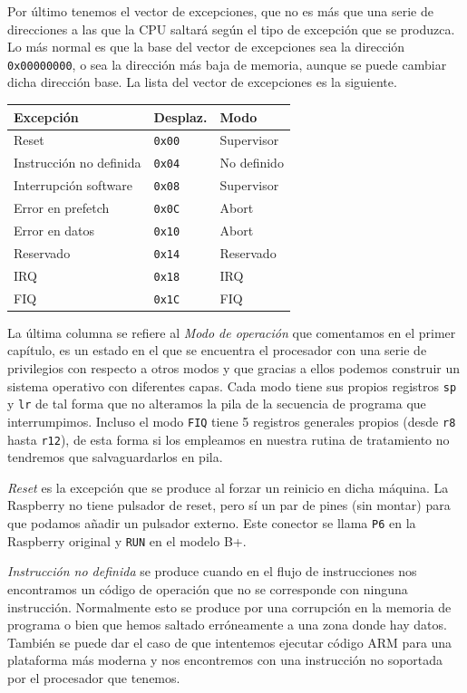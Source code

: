 Por último tenemos el vector de excepciones, que no es más que una serie de
direcciones a las que la CPU saltará según el tipo de excepción que se produzca.
Lo más normal es que la base del vector de excepciones sea la dirección {\tt 0x00000000},
o sea la dirección más baja de memoria, aunque se puede cambiar dicha dirección base.
La lista del vector de excepciones es la siguiente.

\begin{longtable}{ p{5cm} | p{2cm} | p{4cm}}
\hline
{\bf Excepción} & {\bf Desplaz.} & {\bf Modo} \\ \hline
Reset                   & {\tt 0x00} & Supervisor \\ \hline
Instrucción no definida & {\tt 0x04} & No definido \\ \hline
Interrupción software   & {\tt 0x08} & Supervisor \\ \hline
Error en prefetch       & {\tt 0x0C} & Abort \\ \hline
Error en datos          & {\tt 0x10} & Abort \\ \hline
Reservado               & {\tt 0x14} & Reservado \\ \hline
IRQ                     & {\tt 0x18} & IRQ \\ \hline
FIQ                     & {\tt 0x1C} & FIQ \\ \hline
\end{longtable}

La última columna se refiere al {\it Modo de operación} que comentamos en el primer
capítulo, es un estado en el que se encuentra el procesador con una serie de privilegios
con respecto a otros modos y que gracias a ellos podemos construir un sistema operativo
con diferentes capas. Cada modo tiene sus propios registros {\tt sp} y {\tt lr} de tal
forma que no alteramos la pila de la secuencia de programa que interrumpimos. Incluso
el modo {\tt FIQ} tiene 5 registros generales propios (desde {\tt r8} hasta {\tt r12}),
de esta forma si los empleamos en nuestra rutina de tratamiento no tendremos que
salvaguardarlos en pila.

{\it Reset} es la excepción que se produce al forzar un reinicio en dicha máquina. La
Raspberry no tiene pulsador de reset, pero sí un par de pines (sin montar) para que podamos
añadir un pulsador externo. Este conector se llama {\tt P6} en la Raspberry original y
{\tt RUN} en el modelo B+.

{\it Instrucción no definida} se produce cuando en el flujo de instrucciones nos encontramos
un código de operación que no se corresponde con ninguna instrucción. Normalmente esto se
produce por una corrupción en la memoria de programa o bien que hemos saltado erróneamente
a una zona donde hay datos. También se puede dar el caso de que intentemos ejecutar código
ARM para una plataforma más moderna y nos encontremos con una instrucción no soportada por el
procesador que tenemos.

